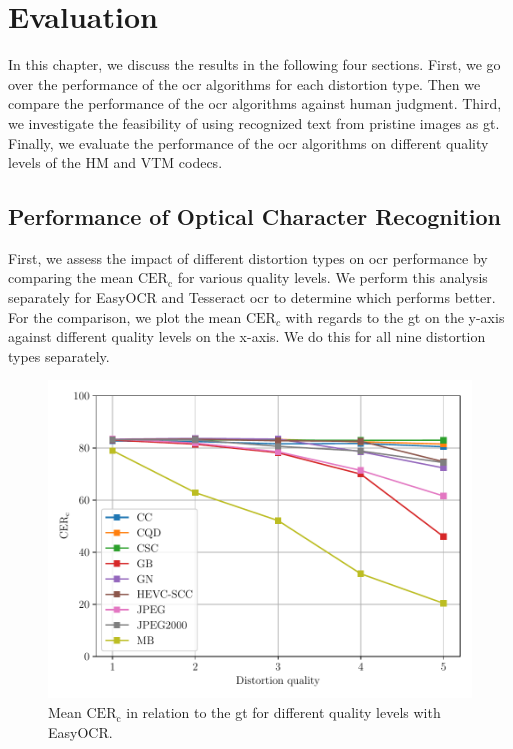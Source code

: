 \chapter{Evaluation}
\label{chap:evaluation}

In this chapter, we discuss the results in the following four sections.
First, we go over the performance of the \gls{ocr} algorithms for each distortion type.
Then we compare the performance of the \gls{ocr} algorithms against human judgment.
Third, we investigate the feasibility of using recognized text from pristine images as \gls{gt}.
Finally, we evaluate the performance of the \gls{ocr} algorithms on different quality levels of the HM and VTM codecs.




\section{Performance of Optical Character Recognition}
\label{sec:ocr_performance}

First, we assess the impact of different distortion types on \gls{ocr} performance by comparing the mean $\text{CER}_{\text{c}}$ for various quality levels.
We perform this analysis separately for EasyOCR and Tesseract \gls{ocr} to determine which performs better.
For the comparison, we plot the mean $\text{CER}_{c}$ with regards to the \gls{gt} on the y-axis against different quality levels on the x-axis.
We do this for all nine distortion types separately.

\begin{figure}[h!]
\centering
    \includegraphics[width=\textwidth]{../../images/analyze/cer_dist_quality_gt_ezocr.pdf}
    \caption{Mean $\text{CER}_{\text{c}}$ in relation to the \gls{gt} for different quality levels with EasyOCR.}
\label{fig:cer_dist_quality_gt_ezocr}
\end{figure}

